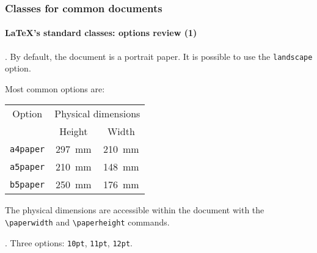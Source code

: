 \documentclass[11pt]{beamer}
\begin{document}
\begin{frame}[fragile]
	\frametitle{Classes for common documents}
	\framesubtitle{\LaTeX{}'s standard classes: options review (1)}
	
	
	.
	By default, the document is a portrait paper. 
	It is possible to use the \texttt{landscape} option.
	
	Most common options are:
	\begin{table}[h]
		\begin{tabular}{*{3}{c}}
			\toprule
			     Option      & \multicolumn{2}{c}{Physical dimensions} \\
			 \cmidrule{2-3}  &    Height     &          Width          \\ \midrule
			\texttt{a4paper} & \SI{297}{\mm} &      \SI{210}{\mm}      \\
			\texttt{a5paper} & \SI{210}{\mm} &      \SI{148}{\mm}      \\
			\texttt{b5paper} & \SI{250}{\mm} &      \SI{176}{\mm}      \\ \bottomrule
		\end{tabular}
	\end{table}

	The physical dimensions are accessible within the document with the \verb|\paperwidth| and \verb|\paperheight| commands.
	
	
	\vspace*{1ex}
	
	
	.
	Three options: \texttt{10pt}, \texttt{11pt}, \texttt{12pt}.
\end{frame}
\end{document}
